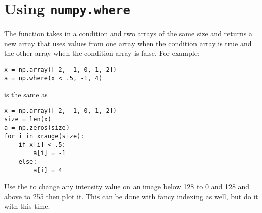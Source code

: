 \section*{Using \texttt{numpy.where}}
The  function takes in a condition and two arrays of the same size and returns a new array that uses values from one array when the condition array is true and the other array when the condition array is false.
For example:
\begin{lstlisting}
x = np.array([-2, -1, 0, 1, 2])
a = np.where(x < .5, -1, 4)
\end{lstlisting}
is the same as
\begin{lstlisting}
x = np.array([-2, -1, 0, 1, 2])
size = len(x)
a = np.zeros(size)
for i in xrange(size):
    if x[i] < .5:
        a[i] = -1
    else:
        a[i] = 4
\end{lstlisting}

\begin{problem}
Use the  to change any intensity value on an image below 128 to 0 and 128 and above to 255 then plot it.
This can be done with fancy indexing as well, but do it with  this time.
\end{problem}
